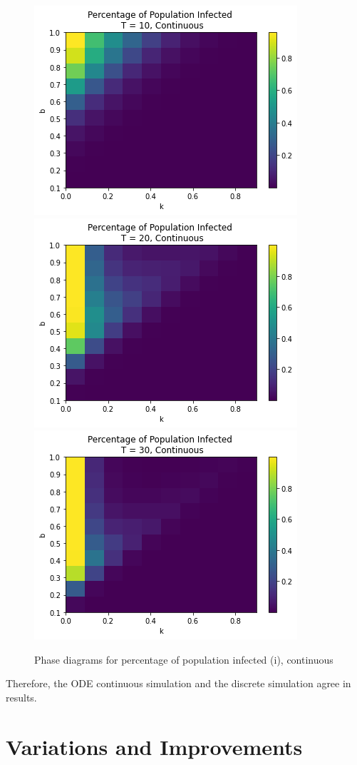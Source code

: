 \documentclass{article}
\begin{document}
\begin{figure}[htp]
\centering
\includegraphics[width=.3\textwidth]{Figure2_ode_infT10_bsmall.png}\hfill
\includegraphics[width=.3\textwidth]{Figure2_ode_infT20_bsmall.png}\hfill
\includegraphics[width=.3\textwidth]{Figure2_ode_infT30_bsmall.png}

\caption{Phase diagrams for percentage of population infected (i), continuous}
\label{fig:figure3}
\end{figure}



Therefore, the ODE continuous simulation and the discrete simulation agree in results.










\section{Variations and Improvements}
\end{document}
